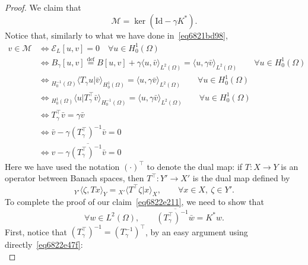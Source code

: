 \documentclass[a4paper,9pt]{amsart}
\newcommand{\scr}[1]{\mathscr{#1}}
\newcommand{\cal}[1]{\mathcal{#1}}
\newcommand{\Id}{\mathrm{Id}}	%
\newcommand{\IFF}{\Leftrightarrow}	%
\theoremstyle{plain}
\theoremstyle{definition}
\theoremstyle{remark}
\begin{document}
\begin{proof}
	We claim that 
	\begin{equation}\label{eq6822e211}
		\cal M = \ker(\Id-\gamma K^*) .
	\end{equation}
	Notice that, similarly to what we have done in~\eqref{eq6821bd98},
	\begin{equation}\label{eq6822ef43}
	\begin{aligned}
		v \in \cal M
		&\IFF \scr E_L[u,v] = 0 \quad\forall u\in H^1_0(\Omega) \\
		&\IFF B_\gamma[u,v] \overset{\text{def}}= B[u,v] + \gamma \langle u,\bar v \rangle_{L^2(\Omega)} = \langle  u , \gamma \bar v \rangle_{L^2(\Omega)}\qquad\forall u\in H^1_0(\Omega) \\
		&\IFF {}_{H^{-1}_0(\Omega)}\langle T_\gamma u | \bar v \rangle_{H^1_0(\Omega)} = \langle  u , \gamma \bar v \rangle_{L^2(\Omega)}\qquad\forall u\in H^1_0(\Omega) \\
		&\IFF {}_{H^{1}_0(\Omega)}\langle  u | T_\gamma^\top \bar v \rangle_{H^{-1}_0(\Omega)} = \langle  u , \gamma \bar v \rangle_{L^2(\Omega)}\qquad\forall u\in H^1_0(\Omega) \\
		&\IFF T_\gamma^\top \bar v = \gamma \bar v \\
		&\IFF \bar v - \gamma (T_\gamma^\top)^{-1} \bar v = 0 \\
		&\IFF v - \gamma \overline{ (T_\gamma^\top)^{-1} \bar v} = 0 
	\end{aligned}
	\end{equation}
	Here we have used the notation $(\cdot)^\top$ to denote the dual map: if $T:X\to Y$ is an operator between Banach spaces, then $T^\top: Y'\to X'$ is the dual map defined by 
	\begin{equation}\label{eq6822e47f}
		{}_{Y'}\langle \zeta ,Tx \rangle_Y = {}_{X'}\langle T^\top\zeta | x \rangle_X ,
		\qquad\forall x\in X,\ \zeta\in Y' .
	\end{equation}
	To complete the proof of our claim~\eqref{eq6822e211}, we need to show that
	\begin{equation}\label{eq6822e442}
		\forall w\in L^2(\Omega),\qquad
		\overline{(T_\gamma^\top)^{-1} \bar w} = K^* w .
	\end{equation}
	First, notice that $(T_\gamma^\top)^{-1} = (T_\gamma^{-1})^\top$, by an easy argument using directly~\eqref{eq6822e47f}:
	\begin{equation}

\end{equation}
\end{proof}
\end{document}
